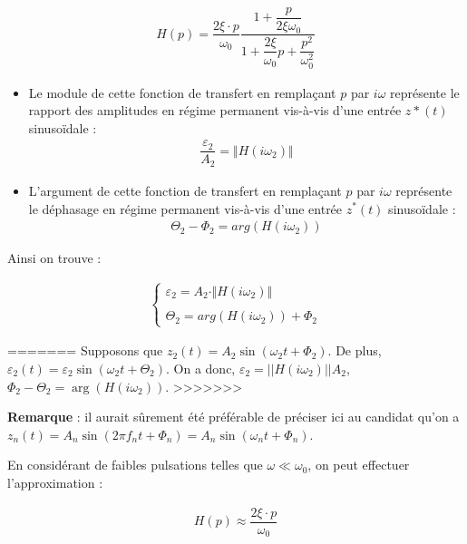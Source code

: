 \documentclass[10pt,fleqn]{article} %
\begin{document}
\begin{align*}
H(p)=\dfrac{2\xi\cdot p}{\omega_0}\dfrac{1+\dfrac{p}{2\xi\omega_0}}{1+\dfrac{2\xi}{\omega_0}p+\dfrac{p^2}{\omega_0^2}}
\end{align*}

\begin{itemize}
\item Le module de cette fonction de transfert en remplaçant $p$ par $i\omega$ représente le rapport des amplitudes en régime permanent vis-à-vis d'une entrée $z*(t)$ sinusoïdale : 
\begin{align*}
\dfrac{\varepsilon_2}{A_2}=\Vert H(i\omega_2)\Vert
\end{align*}
\item L'argument de cette fonction de transfert en remplaçant $p$ par $i\omega$ représente le déphasage en régime permanent vis-à-vis d'une entrée $z^*(t)$ sinusoïdale : 
\begin{align*}
\Theta_2-\Phi_2=arg\left(H(i\omega_2)\right)
\end{align*}
\end{itemize}

Ainsi on trouve : 

\begin{align*}
\left\{
\begin{array}{c}
\varepsilon_2=A_2\cdot \Vert H(i\omega_2)\Vert\\
\\
\Theta_2=arg\left(H(i\omega_2)\right)+\Phi_2
\end{array}
\right.
\end{align*}

=======
\vspace{1cm}
Supposons que  $z_2(t)=A_2\sin \left(\omega_2 t + \Phi_2 \right)$. De plus, $\varepsilon_2(t)=\varepsilon_2 \sin \left( \omega_2 t + \Theta_2 \right)$. On a donc, $\varepsilon_2 = || H\left( i\omega_2\right)|| A_2$, $\Phi_2 - \Theta_2 = \arg \left(H\left(i\omega_2\right)\right)$.
>>>>>>> 

\textbf{Remarque }: il aurait sûrement été préférable de préciser ici au candidat qu'on a $z_n(t)=A_n\sin \left(2\pi f_n t + \Phi_n \right)=A_n\sin \left(\omega_n t + \Phi_n \right)$. 

En considérant de faibles pulsations telles que $\omega\ll \omega_0$, on peut effectuer l'approximation : 

\begin{align*}
H(p)\approx \dfrac{2\xi\cdot p}{\omega_0}
\end{align*}
\end{document}
